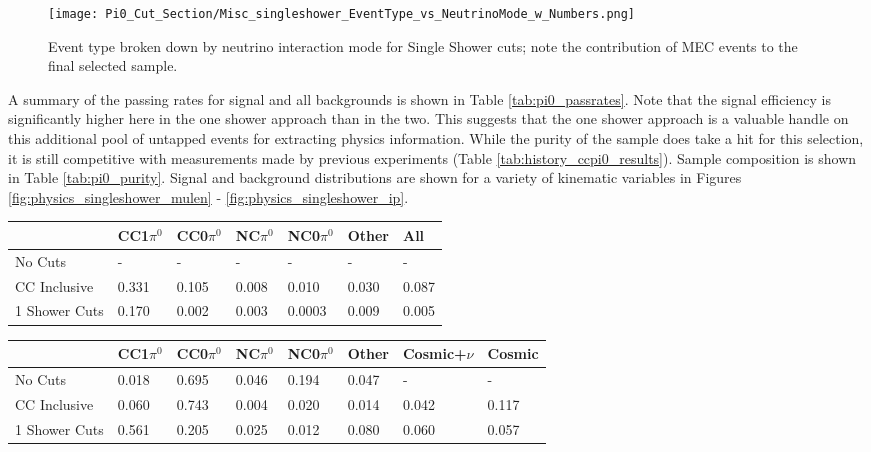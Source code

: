 \begin{figure}[H]
\centering
\texttt{[image: Pi0\_Cut\_Section/Misc\_singleshower\_EventType\_vs\_NeutrinoMode\_w\_Numbers.png]}
\caption{ Event type broken down by neutrino interaction mode for Single Shower cuts; note the contribution of MEC events to the final selected sample. }
\label{fig:physics_singleshower_inttype}
\end{figure}


\par A summary of the passing rates for signal and all backgrounds is shown in Table \ref{tab:pi0_passrates}.  Note that the signal efficiency is significantly higher here in the one shower approach than in the two. This suggests that the one shower approach is a valuable handle on this additional pool of untapped events for extracting physics information. While the purity of the sample does take a hit for this selection, it is still competitive with measurements made by previous experiments (Table \ref{tab:history_ccpi0_results}). Sample composition is shown in Table \ref{tab:pi0_purity}.  Signal and background distributions are shown for a variety of kinematic variables in Figures \ref{fig:physics_singleshower_mulen} - \ref{fig:physics_singleshower_ip}.


\begin{table}[H]
\centering
{}
 \begin{tabular}{| l | l | l |l|l|l|l|}
 \hline
 & CC1$\pi^0$ & CC0$\pi^0$ & NC$\pi^0$ & NC0$\pi^0$ & Other & All \\ [0.1ex] \hline
No Cuts & - & - & - & - & - & -\\
CC Inclusive & 0.331 & 0.105 & 0.008 & 0.010 & 0.030 & 0.087 \\ 
1 Shower Cuts & 0.170 & 0.002 & 0.003 & 0.0003 & 0.009 & 0.005 \\ \hline
\end{tabular}
\end{table}

\begin{table}[H]
\centering
{}
 \begin{tabular}{| l | l | l |l|l|l|l|l|}
 \hline
  & CC1$\pi^0$ & CC0$\pi^0$ & NC$\pi^0$ & NC0$\pi^0$ & Other& Cosmic+$\nu$ & Cosmic\\ [0.1ex] \hline
No Cuts  & 0.018 &  0.695 & 0.046 & 0.194  & 0.047 & -&-\\
CC Inclusive & 0.060 & 0.743 & 0.004 & 0.020 & 0.014 & 0.042 & 0.117  \\ 
1 Shower Cuts & 0.561 & 0.205 & 0.025 & 0.012 & 0.080 & 0.060 & 0.057 \\ \hline
\end{tabular}
\end{table}

